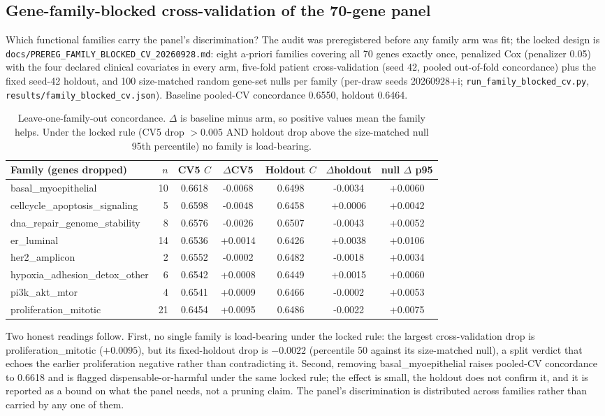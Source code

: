 \subsection{Gene-family-blocked cross-validation of the 70-gene panel}
Which functional families carry the panel's discrimination? The audit was preregistered before any family arm was fit; the locked design is \texttt{docs/PREREG\_FAMILY\_BLOCKED\_CV\_}\allowbreak\texttt{20260928.md}: eight a-priori families covering all 70 genes exactly once, penalized Cox (penalizer 0.05) with the four declared clinical covariates in every arm, five-fold patient cross-validation (seed 42, pooled out-of-fold concordance) plus the fixed seed-42 holdout, and 100 size-matched random gene-set nulls per family (per-draw seeds 20260928+i; \texttt{run\_family\_blocked\_cv.py}, \texttt{results/family\_blocked\_cv.json}). Baseline pooled-CV concordance 0.6550, holdout 0.6464.
\begin{table}[htbp]\centering\footnotesize
\begin{tabular}{lrccccc}\hline
Family (genes dropped) & $n$ & CV5 $C$ & $\Delta$CV5 & Holdout $C$ & $\Delta$holdout & null $\Delta$ p95 \\ \hline
basal\_myoepithelial & 10 & 0.6618 & -0.0068 & 0.6498 & -0.0034 & +0.0060 \\
cellcycle\_apoptosis\_signaling & 5 & 0.6598 & -0.0048 & 0.6458 & +0.0006 & +0.0042 \\
dna\_repair\_genome\_stability & 8 & 0.6576 & -0.0026 & 0.6507 & -0.0043 & +0.0052 \\
er\_luminal & 14 & 0.6536 & +0.0014 & 0.6426 & +0.0038 & +0.0106 \\
her2\_amplicon & 2 & 0.6552 & -0.0002 & 0.6482 & -0.0018 & +0.0034 \\
hypoxia\_adhesion\_detox\_other & 6 & 0.6542 & +0.0008 & 0.6449 & +0.0015 & +0.0060 \\
pi3k\_akt\_mtor & 4 & 0.6541 & +0.0009 & 0.6466 & -0.0002 & +0.0053 \\
proliferation\_mitotic & 21 & 0.6454 & +0.0095 & 0.6486 & -0.0022 & +0.0075 \\
\hline\end{tabular}
\caption{Leave-one-family-out concordance. $\Delta$ is baseline minus arm, so positive values mean the family helps. Under the locked rule (CV5 drop $>0.005$ AND holdout drop above the size-matched null 95th percentile) no family is load-bearing.}\label{tab:family-blocked}
\end{table}
Two honest readings follow. First, no single family is load-bearing under the locked rule: the largest cross-validation drop is proliferation\_mitotic ($+0.0095$), but its fixed-holdout drop is $-0.0022$ (percentile 50 against its size-matched null), a split verdict that echoes the earlier proliferation negative rather than contradicting it. Second, removing basal\_myoepithelial raises pooled-CV concordance to 0.6618 and is flagged dispensable-or-harmful under the same locked rule; the effect is small, the holdout does not confirm it, and it is reported as a bound on what the panel needs, not a pruning claim. The panel's discrimination is distributed across families rather than carried by any one of them.
